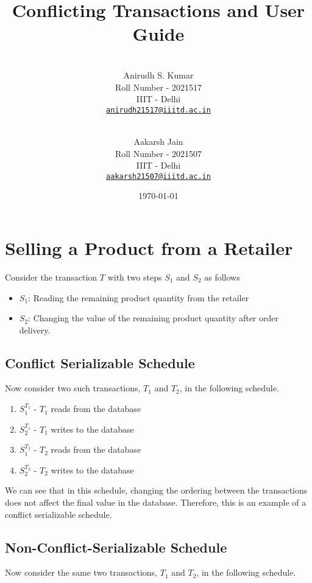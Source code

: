 \documentclass[12pt]{article}
\title{Conflicting Transactions and User Guide}
\author{
    \\\vspace{0em} Anirudh S. Kumar \\\vspace{-0.5em}
    \footnotesize{Roll Number - 2021517}\\\vspace{-0.5em}
    \footnotesize{IIIT - Delhi}\\\vspace{-0.5em}
    \footnotesize{\href{mailto:anirudh21517@iiitd.ac.in}{\texttt{anirudh21517@iiitd.ac.in}}}
  \and
    \\\vspace{0em} Aakarsh Jain\\\vspace{-0.5em}
    \footnotesize{Roll Number - 2021507}\\\vspace{-0.5em}
    \footnotesize{IIIT - Delhi}\\\vspace{-0.5em}
    \footnotesize{\href{mailto:aakarsh21507@iiitd.ac.in}{\texttt{aakarsh21507@iiitd.ac.in}}} 
    \vspace{1em}
}
\date{\today}
\begin{document}
\maketitle

\pagestyle{fancy}
\fancyhf{}
\fancyfoot[C]{\thepage}



\section{Selling a Product from a Retailer}

Consider the transaction $T$ with two steps $S_1$ and $S_2$ as follows
\begin{itemize}[noitemsep]
    \item $S_1$: Reading the remaining product quantity from the retailer
    \item $S_2$: Changing the value of the remaining product quantity after order delivery.
\end{itemize}

\subsection{Conflict Serializable Schedule}

Now consider two such transactions, $T_1$ and $T_2$, in the following schedule.

\begin{enumerate}
    \item $S_1^{T_1}$ - $T_1$ reads from the database
    \item $S_2^{T_1}$ - $T_1$ writes to the database
    \item $S_1^{T_2}$ - $T_2$ reads from the database
    \item $S_2^{T_2}$ - $T_2$ writes to the database
\end{enumerate}

We can see that in this schedule, changing the ordering between the transactions does not affect the final value in the database. Therefore, this is an example of a conflict serializable schedule.


\subsection{Non-Conflict-Serializable Schedule}

Now consider the same two transactions, $T_1$ and $T_2$, in the following schedule.
\end{document}
